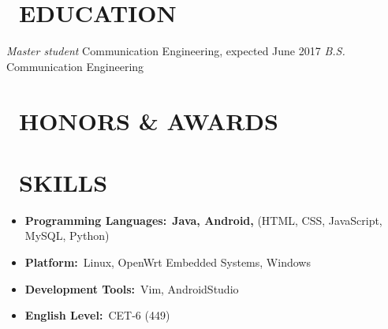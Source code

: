 \documentclass{resume}
\begin{document}


 
\section{\faGraduationCap\ EDUCATION}
\textit{Master student} Communication Engineering, expected June 2017
\textit{B.S.} Communication Engineering

\section{\faTrophy\ HONORS \& AWARDS}
\begin{onehalfspacing}
\end{onehalfspacing}


\section{\faCogs\ SKILLS}
\begin{itemize}[parsep=0.5ex]
  \item \textbf{Programming Languages:}\ \textbf{Java, Android,} (HTML, CSS, JavaScript, MySQL, Python) 
  \item \textbf{Platform:}\ Linux, OpenWrt Embedded Systems, Windows
  \item \textbf{Development Tools:}\ Vim, AndroidStudio
  \item \textbf{English Level:}\ CET-6 (449)
\end{itemize}
\end{document}
